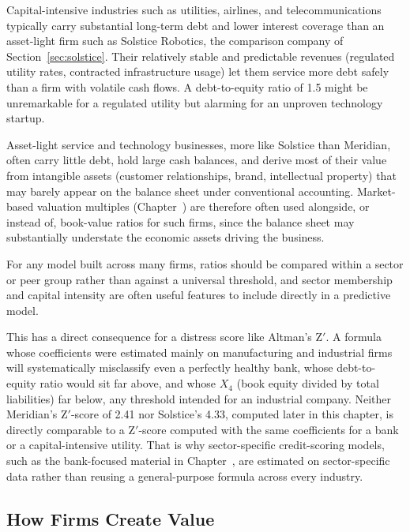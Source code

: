 \documentclass[../ai_in_finance]{subfiles}
\begin{document}
Capital-intensive industries such as utilities, airlines, and telecommunications typically carry substantial long-term debt and lower interest coverage than an asset-light firm such as Solstice Robotics, the comparison company of Section~\ref{sec:solstice}. Their relatively stable and predictable revenues (regulated utility rates, contracted infrastructure usage) let them service more debt safely than a firm with volatile cash flows. A debt-to-equity ratio of 1.5 might be unremarkable for a regulated utility but alarming for an unproven technology startup.

Asset-light service and technology businesses, more like Solstice than Meridian, often carry little debt, hold large cash balances, and derive most of their value from intangible assets (customer relationships, brand, intellectual property) that may barely appear on the balance sheet under conventional accounting. Market-based valuation multiples (Chapter~) are therefore often used alongside, or instead of, book-value ratios for such firms, since the balance sheet may substantially understate the economic assets driving the business.

For any model built across many firms, ratios should be compared within a sector or peer group rather than against a universal threshold, and sector membership and capital intensity are often useful features to include directly in a predictive model.

This has a direct consequence for a distress score like Altman's Z$'$. A formula whose coefficients were estimated mainly on manufacturing and industrial firms will systematically misclassify even a perfectly healthy bank, whose debt-to-equity ratio would sit far above, and whose $X_4$ (book equity divided by total liabilities) far below, any threshold intended for an industrial company. Neither Meridian's Z$'$-score of 2.41 nor Solstice's 4.33, computed later in this chapter, is directly comparable to a Z$'$-score computed with the same coefficients for a bank or a capital-intensive utility. That is why sector-specific credit-scoring models, such as the bank-focused material in Chapter~, are estimated on sector-specific data rather than reusing a general-purpose formula across every industry.

\subsection{How Firms Create Value}
\end{document}
